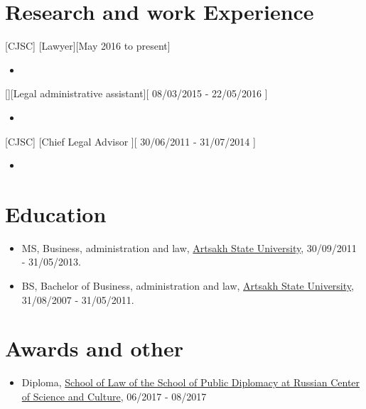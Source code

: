 \documentclass{article}
\begin{document}
\section{Research and work Experience}
 

 
[CJSC]
[Lawyer][May 2016 to present]
   \begin{itemize}
   \item 
   \end{itemize}

[][Legal administrative assistant][ 08/03/2015 - 22/05/2016 ]
\begin{itemize}
   \item 
   \end{itemize}

[CJSC]
[Chief Legal Advisor ][ 30/06/2011 - 31/07/2014 ]

\begin{itemize}
\item 
\end{itemize}
 

 
 
\section{Education}
 
\begin{itemize}
\item MS, Business, administration and law, \href{http://www.asu.am/}{Artsakh State University},  30/09/2011 - 31/05/2013.
\item BS, Bachelor of Business, administration and law, \href{http://www.asu.am/}{Artsakh State University}, 31/08/2007 - 31/05/2011.
\end{itemize}

 
\section{Awards and other}
\begin{itemize}
\item Diploma, \href{http://www.schoolofpublicdiplomacy.com/}{School of Law of the School of Public Diplomacy at Russian Center of Science and Culture},  06/2017 - 08/2017 
\end{itemize}
 
\end{document}
